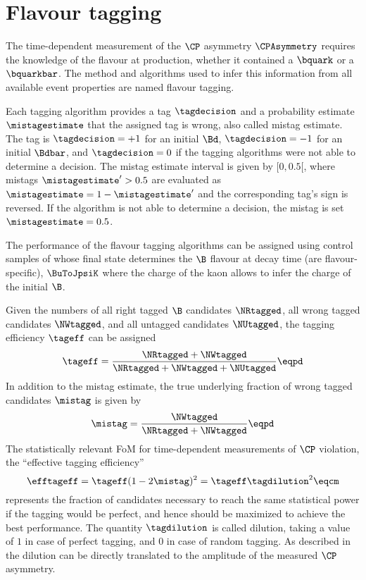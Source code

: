 
\chapter{Flavour tagging}
\label{ch:flavour_tagging}

The time-dependent measurement of the $\CP$ asymmetry $\CPAsymmetry$ 
requires the knowledge of the \Bmeson flavour at production, \ie whether it
contained a $\bquark$ or a $\bquarkbar$. The method and algorithms used to infer
this information from all available event properties are named flavour tagging.

Each tagging algorithm provides a tag $\tagdecision$ and a probability estimate
$\mistagestimate$ that the assigned tag is wrong, also called mistag estimate.
The tag is $\tagdecision=+1$ for an initial $\Bd$, $\tagdecision=-1$ for an
initial $\Bdbar$, and $\tagdecision=0$ if the tagging algorithms were not able
to determine a decision. The mistag estimate interval is given by ${[0,0.5[}$,
where mistags $\mistagestimate^{\prime}>0.5$ are evaluated as $\mistagestimate =
1 - \mistagestimate^{\prime}$ and the corresponding tag's sign is reversed. If
the algorithm is not able to determine a decision, the mistag is set
$\mistagestimate=0.5$.

The performance of the flavour tagging algorithms can be assigned using control
samples of \Bmesons whose final state determines the $\B$ flavour at decay time
(\ie are flavour-specific), \eg $\BuToJpsiK$ where the charge of the kaon allows
to infer the charge of the initial $\B$.

Given the numbers of all right tagged $\B$ candidates $\NRtagged$, all wrong
tagged candidates $\NWtagged$, and all untagged candidates $\NUtagged$, the
tagging efficiency $\tageff$ can be assigned
%
\begin{equation}\label{eq:flavour_tagging:tageff}
  \tageff = \frac{\NRtagged + \NWtagged}{\NRtagged + \NWtagged + \NUtagged}\eqpd
\end{equation}
%
In addition to the mistag estimate, the true underlying fraction of wrong tagged
candidates $\mistag$ is given by
%
\begin{equation}\label{eq:flavour_tagging:mistag}
  \mistag = \frac{\NWtagged}{\NRtagged + \NWtagged}\eqpd
\end{equation}
%
The statistically relevant \acl{FoM} for time-dependent measurements of $\CP$
violation, the \enquote{effective tagging efficiency}
%
\begin{equation}\label{eq:flavour_tagging:efftageff}
  \efftageff = \tageff(1 - 2 \mistag)^2 = \tageff \tagdilution^2 \eqcm
\end{equation}
%
represents the fraction of candidates necessary to reach the same statistical
power if the tagging would be perfect, and hence should be maximized to achieve
the best performance. The quantity $\tagdilution$ is called dilution, taking a
value of $1$ in case of perfect tagging, and $0$ in case of random tagging. As
described \eg in \Ref~\cite[][Ch. 10.3]{Bevan:2014iga} the dilution can be
directly translated to the amplitude of the measured $\CP$ asymmetry.

